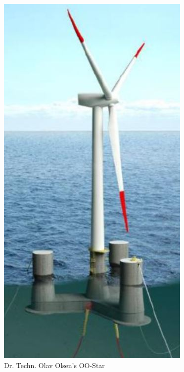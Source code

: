\begin{figure}[H]
\centering
\includegraphics[scale=0.5]{figures/oostar}
\caption[$\; \:$Dr. Techn. Olav Olsen's OO-Star]{Dr. Techn. Olav Olsen's OO-Star \cite{Lifes50+D4.2} }
 \label{fig:oostarintro}
\end{figure}


